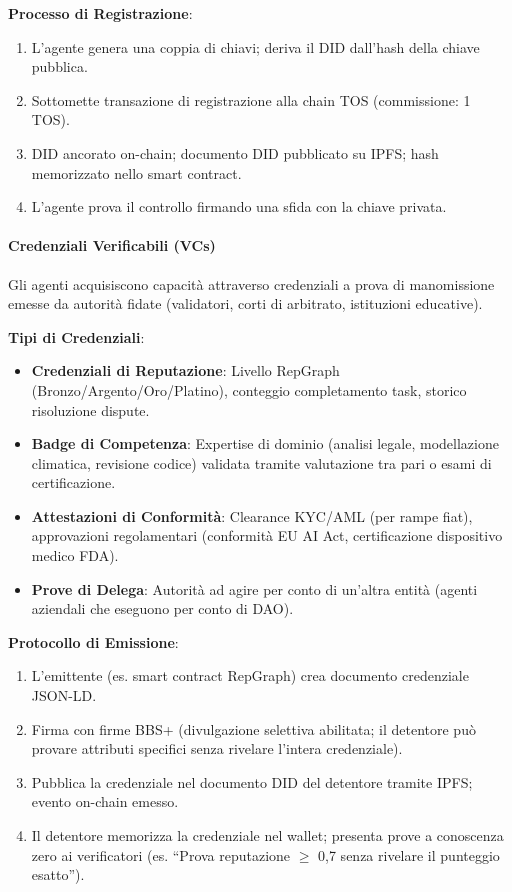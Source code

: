 \documentclass[11pt]{article}
\begin{document}
\textbf{Processo di Registrazione}:
\begin{enumerate}[noitemsep]
  \item L'agente genera una coppia di chiavi; deriva il DID dall'hash della chiave pubblica.
  \item Sottomette transazione di registrazione alla chain TOS (commissione: 1 TOS).
  \item DID ancorato on-chain; documento DID pubblicato su IPFS; hash memorizzato nello smart contract.
  \item L'agente prova il controllo firmando una sfida con la chiave privata.
\end{enumerate}

\paragraph{Credenziali Verificabili (VCs)}
Gli agenti acquisiscono capacità attraverso credenziali a prova di manomissione emesse da autorità fidate (validatori, corti di arbitrato, istituzioni educative).

\textbf{Tipi di Credenziali}:
\begin{itemize}[noitemsep]
  \item \textbf{Credenziali di Reputazione}: Livello RepGraph (Bronzo/Argento/Oro/Platino), conteggio completamento task, storico risoluzione dispute.
  \item \textbf{Badge di Competenza}: Expertise di dominio (analisi legale, modellazione climatica, revisione codice) validata tramite valutazione tra pari o esami di certificazione.
  \item \textbf{Attestazioni di Conformità}: Clearance KYC/AML (per rampe fiat), approvazioni regolamentari (conformità EU AI Act, certificazione dispositivo medico FDA).
  \item \textbf{Prove di Delega}: Autorità ad agire per conto di un'altra entità (agenti aziendali che eseguono per conto di DAO).
\end{itemize}

\textbf{Protocollo di Emissione}:
\begin{enumerate}[noitemsep]
  \item L'emittente (es. smart contract RepGraph) crea documento credenziale JSON-LD.
  \item Firma con firme BBS+ (divulgazione selettiva abilitata; il detentore può provare attributi specifici senza rivelare l'intera credenziale).
  \item Pubblica la credenziale nel documento DID del detentore tramite IPFS; evento on-chain emesso.
  \item Il detentore memorizza la credenziale nel wallet; presenta prove a conoscenza zero ai verificatori (es. ``Prova reputazione $\geq$ 0,7 senza rivelare il punteggio esatto'').
\end{enumerate}
\end{document}

